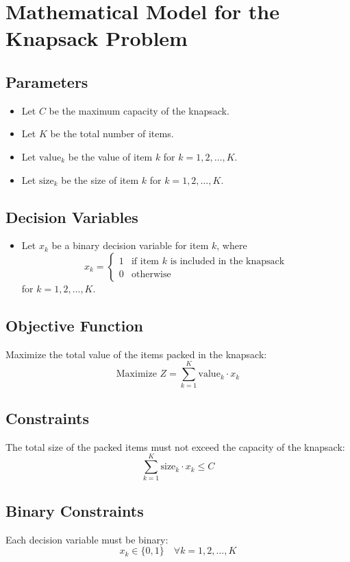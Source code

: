 \documentclass{article}
\begin{document}
\section*{Mathematical Model for the Knapsack Problem}

\subsection*{Parameters}
\begin{itemize}
    \item Let \( C \) be the maximum capacity of the knapsack.
    \item Let \( K \) be the total number of items.
    \item Let \( \text{value}_k \) be the value of item \( k \) for \( k = 1, 2, \ldots, K \).
    \item Let \( \text{size}_k \) be the size of item \( k \) for \( k = 1, 2, \ldots, K \).
\end{itemize}

\subsection*{Decision Variables}
\begin{itemize}
    \item Let \( x_k \) be a binary decision variable for item \( k \), where
    \[
    x_k = 
    \begin{cases} 
      1 & \text{if item } k \text{ is included in the knapsack} \\
      0 & \text{otherwise}
    \end{cases}
    \]
    for \( k = 1, 2, \ldots, K \).
\end{itemize}

\subsection*{Objective Function}
Maximize the total value of the items packed in the knapsack:
\[
\text{Maximize } Z = \sum_{k=1}^{K} \text{value}_k \cdot x_k
\]

\subsection*{Constraints}
The total size of the packed items must not exceed the capacity of the knapsack:
\[
\sum_{k=1}^{K} \text{size}_k \cdot x_k \leq C
\]

\subsection*{Binary Constraints}
Each decision variable must be binary:
\[
x_k \in \{0, 1\} \quad \forall k = 1, 2, \ldots, K
\]
\end{document}
